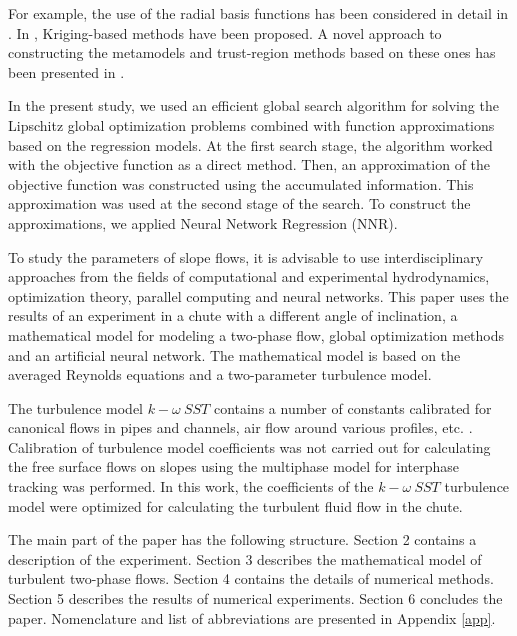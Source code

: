 \documentclass[mathematics,article,submit,pdftex,moreauthors]{Definitions/mdpi}
\begin{document}
For example, the use of the radial basis functions has been considered in detail in \cite{Gutmann2001,Regis2005}. In \cite{Jones1998,UrRehman2014,Ollar2017_1}, Kriging-based methods have been proposed. A novel approach to constructing the metamodels and trust-region methods based on these ones has been presented in \cite{Polynkin2012,Ollar2017_2,Toropov2018}. 

In the present study, we used an efficient global search algorithm \cite{Strongin2000,Sergeyev2013} for solving the Lipschitz global optimization problems combined with function approximations based on the regression models. At the first search stage, the algorithm worked with the objective function as a direct method. Then, an approximation of the objective function was constructed using the accumulated information. This approximation was used at the second stage of the search.
To construct the approximations, we applied Neural Network Regression (NNR).

To study the parameters of slope flows, it is advisable to use interdisciplinary approaches from the fields of computational and experimental hydrodynamics, optimization theory, parallel computing and neural networks. This paper uses the results of an experiment in a chute with a different angle of inclination, a mathematical model for modeling a two-phase flow, global optimization methods and an artificial neural network. The mathematical model is based on the averaged Reynolds equations and a two-parameter turbulence model. 

The turbulence model $k-\omega\ SST$ contains a number of constants calibrated for canonical flows in pipes and channels, air flow around various profiles, etc. \cite{LaunderSpalding1974, Tahry1983, LaunderMorseRodiSpaldiug1972}. Calibration of turbulence model coefficients was not carried out for calculating the free surface flows on slopes using the multiphase model for interphase tracking was performed. In this work, the coefficients of the $k-\omega\ SST$ turbulence model were optimized for calculating the turbulent fluid flow in the chute.

The main part of the paper has the following structure. 
Section 2 contains a description of the experiment. Section 3 describes the mathematical model of turbulent two-phase flows. Section 4 contains the details of numerical methods. 
Section 5 describes the results of numerical experiments. 
Section 6 concludes the paper. Nomenclature and list of abbreviations are presented in Appendix \ref{app}.
\end{document}
